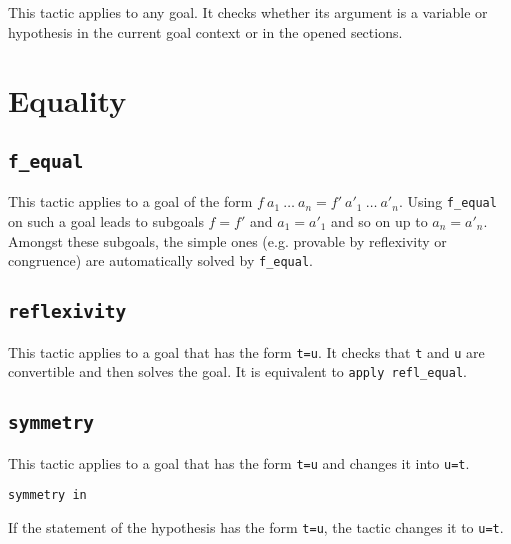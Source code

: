 \begin{coq_example*}
This tactic applies to any goal. It checks whether its argument is a
variable or hypothesis in the current goal context or in the opened sections.

\ErrMsg {}

\section{Equality}

\subsection{\tt f\_equal}
\label{f-equal}

This tactic applies to a goal of the form $f\ a_1\ \ldots\ a_n = f'\
a'_1\ \ldots\ a'_n$. Using {\tt f\_equal} on such a goal leads to
subgoals $f=f'$ and $a_1=a'_1$ and so on up to $a_n=a'_n$. Amongst
these subgoals, the simple ones (e.g. provable by
reflexivity or congruence) are automatically solved by {\tt f\_equal}.

\subsection{\tt reflexivity}
\label{reflexivity}

This tactic applies to a goal that has the form {\tt t=u}. It checks
that {\tt t} and {\tt u} are convertible and then solves the goal.
It is equivalent to {\tt apply refl\_equal}.

\begin{ErrMsgs}
\item {}
\item {}
\end{ErrMsgs}

\subsection{\tt symmetry}

This tactic applies to a goal that has the form {\tt t=u} and changes it
into {\tt u=t}.

\begin{Variants}
\item {\tt symmetry in \ident} 

If the statement of the hypothesis {\ident} has the form {\tt t=u},
the tactic changes it to {\tt u=t}.
\end{Variants}


\end{coq_example*}
